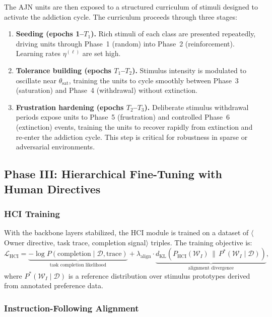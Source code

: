 \documentclass[12pt,a4paper]{article}
\begin{document}
The AJN units are then exposed to a structured curriculum of stimuli designed
to activate the addiction cycle. The curriculum proceeds through three stages:
\begin{enumerate}
  \item \textbf{Seeding (epochs 1--$T_1$).} Rich stimuli of each class are
    presented repeatedly, driving units through Phase~1 (random) into Phase~2
    (reinforcement). Learning rates $\eta^{(\ell)}$ are set high.
  \item \textbf{Tolerance building (epochs $T_1$--$T_2$).} Stimulus intensity
    is modulated to oscillate near $\theta_{\text{sat}}$, training the units
    to cycle smoothly between Phase~3 (saturation) and Phase~4 (withdrawal)
    without extinction.
  \item \textbf{Frustration hardening (epochs $T_2$--$T_3$).} Deliberate
    stimulus withdrawal periods expose units to Phase~5 (frustration) and
    controlled Phase~6 (extinction) events, training the units to recover
    rapidly from extinction and re-enter the addiction cycle. This step is
    critical for robustness in sparse or adversarial environments.
\end{enumerate}

\subsection{Phase III: Hierarchical Fine-Tuning with Human Directives}

\subsubsection{HCI Training}

With the backbone layers stabilized, the HCI module is trained on a dataset
of $\langle$Owner directive, task trace, completion signal$\rangle$ triples.
The training objective is:
\begin{equation}
  \mathcal{L}_{\text{HCI}} = \underbrace{-\log P(\text{completion} \mid
  \mathcal{D}, \text{trace})}_{\text{task completion likelihood}}
  + \lambda_\text{align} \cdot
  \underbrace{d_{\text{KL}}\!\left(
    P_{\text{HCI}}(\mathcal{W}_I) \,\|\, P^*(\mathcal{W}_I \mid \mathcal{D})
  \right)}_{\text{alignment divergence}},
  \label{eq:hci_loss}
\end{equation}
where $P^*(\mathcal{W}_I \mid \mathcal{D})$ is a reference distribution over
stimulus prototypes derived from annotated preference data.

\subsubsection{Instruction-Following Alignment}
\end{document}

